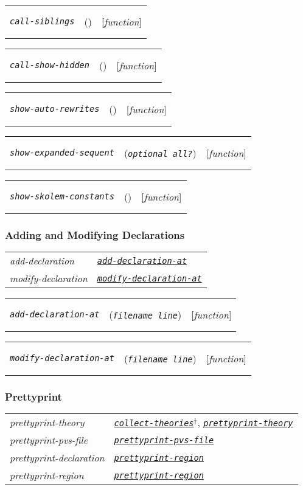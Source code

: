 \documentclass[12pt]{book}
\makeatletter
\def\ampoptional{{\smaller\sc {\smaller\smaller \&}optional\ }}
\newenvironment{function}[3]%
{\par\noindent\begin{boxedminipage}{\textwidth}%
 \par\noindent\begin{tabularx}{\linewidth}{l>{\raggedright}Xr}%
 \functionhtgt{#1}&(\texttt{\textit{#2}})&[\emph{#3}]%
 \end{tabularx}\par\flushright\begin{minipage}{.97\textwidth}}
{\end{minipage}\end{boxedminipage}}
\newcommand{\functionnm}[1]{\texttt{\textit{#1}}}
\newcommand{\functionhln}[1]{\hyperlink{#1}{\functionnm{#1}}}
\newcommand{\functionhtgt}[1]{\hypertarget{#1}{\functionnm{#1}}\index{#1@\functionnm{#1}|underline}}
\newenvironment{lispfunction}[2]%
{\begin{function}{#1}{#2}{function}}{\end{function}}
\makeatother
\begin{document}
\begin{lispfunction}{call-siblings}{}
\end{lispfunction}

\begin{lispfunction}{call-show-hidden}{}
\end{lispfunction}

\begin{lispfunction}{show-auto-rewrites}{}
\end{lispfunction}

\begin{lispfunction}{show-expanded-sequent}{\ampoptional all?}
\end{lispfunction}

\begin{lispfunction}{show-skolem-constants}{}
\end{lispfunction}

\subsubsection{Adding and Modifying Declarations}
\noindent\begin{tabularx}{\linewidth}{|>{\itshape\ttfamily}l|>{\raggedright\arraybackslash}X|}\hline
  add-declaration & \functionhln{add-declaration-at} \\
  modify-declaration & \functionhln{modify-declaration-at} \\ \hline
\end{tabularx}

\begin{lispfunction}{add-declaration-at}{filename line}
\end{lispfunction}

\begin{lispfunction}{modify-declaration-at}{filename line}
\end{lispfunction}


\subsubsection{Prettyprint}
\noindent\begin{tabularx}{\linewidth}{|>{\itshape\ttfamily}l|>{\raggedright\arraybackslash}X|}\hline
  prettyprint-theory & \functionhln{collect-theories}$^\dagger$,
                       \functionhln{prettyprint-theory} \\
  prettyprint-pvs-file & \functionhln{prettyprint-pvs-file} \\
  prettyprint-declaration & \functionhln{prettyprint-region} \\
  prettyprint-region & \functionhln{prettyprint-region} \\ \hline
\end{tabularx}
\end{document}
